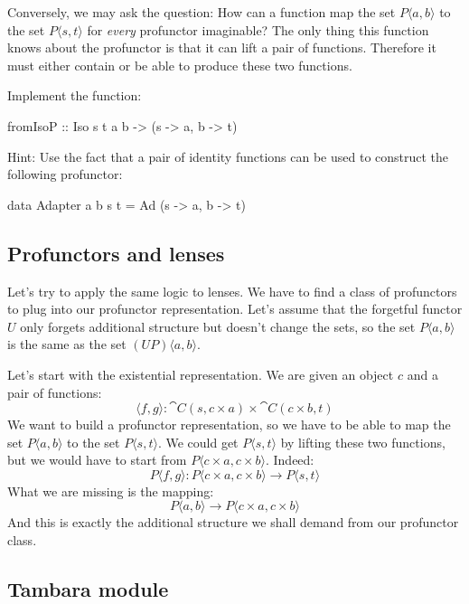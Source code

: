 \documentclass[DaoFP]{subfiles}
\begin{document}
Conversely, we may ask the question: How can a function map the set $P \langle a, b \rangle$ to the set $P \langle s, t \rangle$ for \emph{every} profunctor imaginable? The only thing this function knows about the profunctor is that it can lift a pair of functions. Therefore it must either contain or be able to produce these two functions. 

\begin{exercise}
Implement the function:
\begin{haskell}
fromIsoP :: Iso s t a b -> (s -> a, b -> t)
\end{haskell}
Hint: Use the fact that a pair of identity functions can be used to construct the following profunctor:
\begin{haskell}
data Adapter a b s t = Ad (s -> a, b -> t)
\end{haskell}
\end{exercise}

\subsection{Profunctors and lenses}

Let's try to apply the same logic to lenses. We have to find a class of profunctors to plug into our profunctor representation. Let's assume that the forgetful functor $U$ only forgets additional structure but doesn't change the sets, so the set $P \langle a, b \rangle$ is the same as the set $(U P) \langle a, b \rangle$. 

Let's start with the existential representation. We are given an object $c$ and a pair of functions:
\[  \langle f, g \rangle \colon \cat C(s, c \times a) \times \cat C(c \times b, t) \]
We want to build a profunctor representation, so we have to be able to map the set $P \langle a, b \rangle$ to the set $P \langle s, t \rangle$. We could get $P \langle s, t \rangle$ by lifting these two functions, but we would have to start from $P \langle c \times a, c \times b \rangle$. Indeed:
\[ P \langle f, g \rangle \colon P \langle c \times a, c \times b \rangle \to P \langle s, t \rangle \]
What we are missing is the mapping:
\[ P \langle a, b \rangle \to P \langle c \times a, c \times b \rangle \]
And this is exactly the additional structure we shall demand from our profunctor class. 

\subsection{Tambara module}
\end{document}
